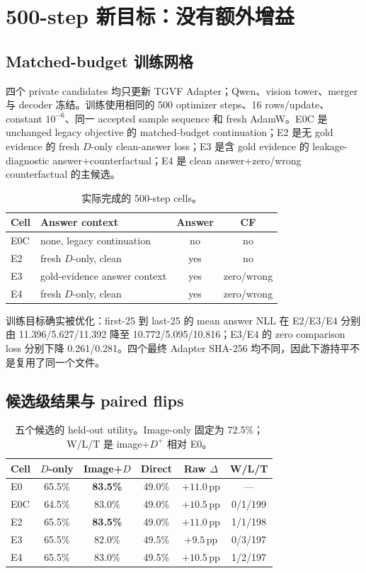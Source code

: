 \documentclass[UTF8,twocolumn,10pt,a4paper]{ctexart}
\newcommand{\Dpos}{D^{+}}
\newcommand{\pp}{\,\mathrm{pp}}
\begin{document}
\section{500-step 新目标：没有额外增益}

\subsection{Matched-budget 训练网格}

四个 private candidates 均只更新 TGVF Adapter；Qwen、vision tower、merger 与 decoder 冻结。训练使用相同的 500 optimizer steps、16 rows/update、constant $10^{-6}$、同一 accepted sample sequence 和 fresh AdamW。E0C 是 unchanged legacy objective 的 matched-budget continuation；E2 是无 gold evidence 的 fresh $D$-only clean-answer loss；E3 是含 gold evidence 的 leakage-diagnostic answer+counterfactual；E4 是 clean answer+zero/wrong counterfactual 的主候选。

\begin{table}[t]
\centering
\caption{实际完成的 500-step cells。}
\label{tab:cells}
\small
\begin{tabularx}{\columnwidth}{lYcc}
\toprule
Cell & Answer context & Answer & CF \\
\midrule
E0C & none, legacy continuation & no & no \\
E2 & fresh $D$-only, clean & yes & no \\
E3 & gold-evidence answer context & yes & zero/wrong \\
E4 & fresh $D$-only, clean & yes & zero/wrong \\
\bottomrule
\end{tabularx}
\end{table}

训练目标确实被优化：first-25 到 last-25 的 mean answer NLL 在 E2/E3/E4 分别由 11.396/5.627/11.392 降至 10.772/5.095/10.816；E3/E4 的 zero comparison loss 分别下降 0.261/0.281。四个最终 Adapter SHA-256 均不同，因此下游持平不是复用了同一个文件。

\subsection{候选级结果与 paired flips}

\begin{table}[t]
\centering
\caption{五个候选的 held-out utility。Image-only 固定为 72.5\%；W/L/T 是 image+$\Dpos$ 相对 E0。}
\label{tab:candidates}
\scriptsize
\begin{tabular}{lccccc}
\toprule
Cell & $D$-only & Image+$D$ & Direct & Raw $\Delta$ & W/L/T \\
\midrule
E0 & 65.5\% & \textbf{83.5\%} & 49.0\% & $+11.0\pp$ & --- \\
E0C & 64.5\% & 83.0\% & 49.0\% & $+10.5\pp$ & 0/1/199 \\
E2 & 65.5\% & \textbf{83.5\%} & 49.0\% & $+11.0\pp$ & 1/1/198 \\
E3 & 65.5\% & 82.0\% & 49.5\% & $+9.5\pp$ & 0/3/197 \\
E4 & 65.5\% & 83.0\% & 49.5\% & $+10.5\pp$ & 1/2/197 \\
\bottomrule
\end{tabular}
\end{table}
\end{document}
